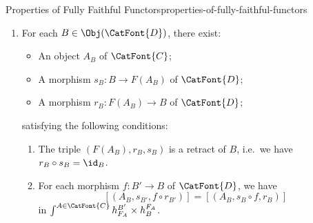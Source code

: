 \begin{proposition}{Properties of Fully Faithful Functors}{properties-of-fully-faithful-functors}
\begin{enumerate}
\begin{enumerate}
\[                        \colon%
                        \Lan_{h_{F}}(h^{F})%
                        \Longrightarrow%
                        h%
                    \]%
                    with components
                    \[
                        \alpha_{B',B}%
                        \colon%
                        \int^{A\in\CatFont{C}}h^{B'}_{F_{A}}\times h^{F_{A}}_{B}%
                        \to%
                        h^{B'}_{B}
                    \]%
                    given by
                    \[
                        \alpha_{B',B}([(\phi,\psi)])%
                        =%
                        \psi\circ\phi%
                    \]%
                    is a natural isomorphism.
                \item\label{properties-of-fully-faithful-functors-interaction-with-precomposition-4-i}For each $B\in\Obj(\CatFont{D})$, there exist:
                    \begin{itemize}%
                        \item An object $A_{B}$ of $\CatFont{C}$;
                        \item A morphism $s_{B}\colon B\to F(A_{B})$ of $\CatFont{D}$;
                        \item A morphism $r_{B}\colon F(A_{B})\to B$ of $\CatFont{D}$;
                    \end{itemize}%
                    satisfying the following conditions:
                    \begin{enumerate}
                        \item\label{properties-of-fully-faithful-functors-interaction-with-precomposition-4-i-a}The triple $(F(A_{B}),r_{B},s_{B})$ is a retract of $B$, i.e.\ we have $r_{B}\circ s_{B}=\id_{B}$.
                        \item\label{properties-of-fully-faithful-functors-interaction-with-precomposition-4-i-b}For each morphism $f\colon B'\to B$ of $\CatFont{D}$, we have
                            \[
                                [(A_{B},s_{B'},f\circ r_{B'})]%
                                =%
                                [(A_{B},s_{B}\circ f,r_{B})]%
                            \]%
                            in $\int^{A\in\CatFont{C}}h^{B'}_{F_{A}}\times h^{F_{A}}_{B}$.
                    \end{enumerate}
            \end{enumerate}
    \end{enumerate}
\end{proposition}
